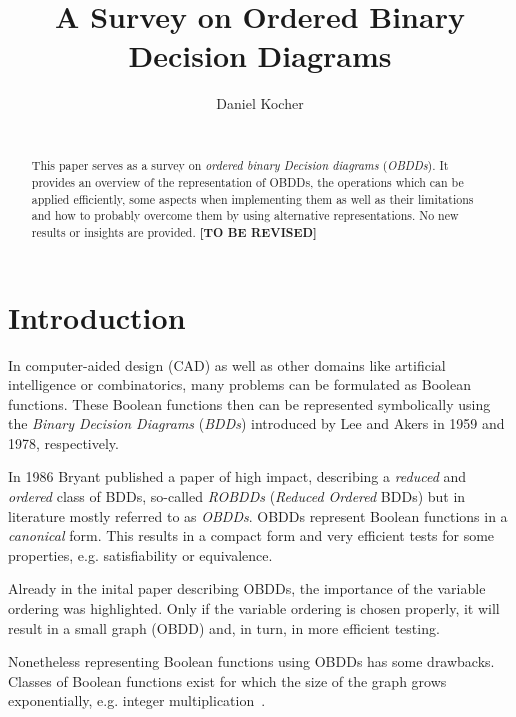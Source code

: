 \documentclass{vldb}
\newcommand{\tbr}{\textbf{[TO BE REVISED]}}
\begin{document}
\title{A Survey on Ordered Binary Decision Diagrams}


\author{
\alignauthor
	Daniel Kocher\\
    \\
}

\maketitle

\begin{abstract}
This paper serves as a survey on \textit{ordered binary Decision diagrams}
(\textit{OBDDs}). It provides an overview of the representation of OBDDs, the
operations which can be applied efficiently, some aspects when implementing them
as well as their limitations and how to probably overcome them by using
alternative representations. No new results or insights are provided.
\tbr
\end{abstract}

\section{Introduction}
\label{sec:introduction}

In computer-aided design (CAD) as well as other domains like artificial
intelligence or combinatorics, many problems can be formulated as Boolean
functions. These Boolean functions then can be represented symbolically using the
\textit{Binary Decision Diagrams} (\textit{BDDs}) introduced by Lee\cite{LEE59}
and Akers\cite{AKERS78} in 1959 and 1978, respectively.

In 1986 Bryant\cite{BRYANT86} published a paper of high impact, describing a
\textit{reduced} and \textit{ordered} class of BDDs, so-called \textit{ROBDDs}
(\textit{Reduced Ordered} BDDs) but in literature mostly referred to as
\textit{OBDDs}. OBDDs represent Boolean functions in a \textit{canonical}
form. This results in a compact form and very efficient tests for some properties,
e.g. satisfiability or equivalence\cite{BRYANT86}.

Already in the inital paper describing OBDDs, the importance of the variable
ordering was highlighted. Only if the variable ordering is chosen properly, it
will result in a small graph (OBDD) and, in turn, in more efficient testing.

Nonetheless representing Boolean functions using OBDDs has some drawbacks. Classes
of Boolean functions exist for which the size of the graph grows exponentially,
e.g. integer multiplication~\cite{BRYANT86, BRYANT91, WOELFEL01}.
\end{document}
